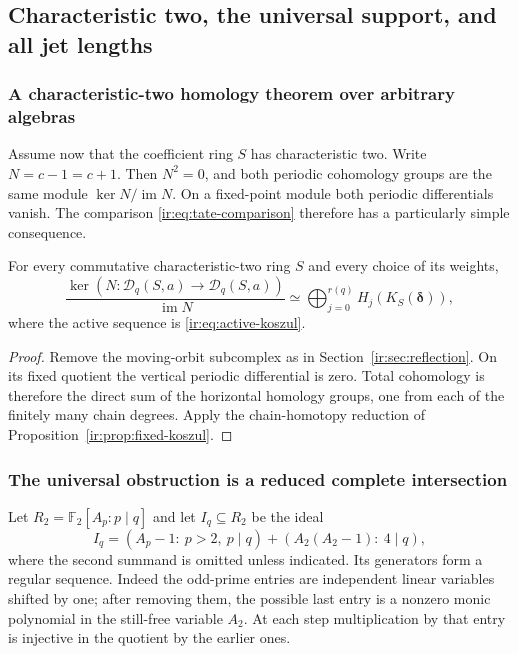 \subsection{Characteristic two, the universal support, and all jet lengths}
\label{ir:sec:modular}

\subsubsection{A characteristic-two homology theorem over arbitrary algebras}
Assume now that the coefficient ring $S$ has characteristic two.
Write $N=c-1=c+1$. Then $N^2=0$, and both periodic cohomology
groups are the same module $\ker N/\operatorname{im} N$. On a fixed-point module
both periodic differentials vanish. The comparison
\eqref{ir:eq:tate-comparison} therefore has a particularly simple
consequence.

\begin{theorem}
\label{ir:thm:char2-koszul}
For every commutative characteristic-two ring $S$ and every choice
of its weights,
\begin{equation}\label{ir:eq:char2-homology}
 \frac{\ker(N:\mathcal D_q(S,a)\to\mathcal D_q(S,a))}{\operatorname{im} N}
 \simeq\bigoplus_{j=0}^{r(q)}H_j(K_S(\boldsymbol\delta)),
\end{equation}
where the active sequence is \eqref{ir:eq:active-koszul}.
\end{theorem}
\begin{proof}
Remove the moving-orbit subcomplex as in
Section~\ref{ir:sec:reflection}. On its fixed quotient the vertical
periodic differential is zero. Total cohomology is therefore the
direct sum of the horizontal homology groups, one from each of the
finitely many chain degrees. Apply the chain-homotopy reduction of
Proposition~\ref{ir:prop:fixed-koszul}.
\end{proof}

\subsubsection{The universal obstruction is a reduced complete intersection}
Let $R_2=\mathbb F_2[A_p:p\mid q]$ and let $I_q\subseteq R_2$ be the ideal
\begin{equation}\label{ir:eq:universal-ideal}
 I_q=(A_p-1:\ p>2,\ p\mid q)
       +(A_2(A_2-1):\ 4\mid q),
\end{equation}
where the second summand is omitted unless indicated. Its generators
form a regular sequence. Indeed the odd-prime entries are independent
linear variables shifted by one; after removing them, the possible
last entry is a nonzero monic polynomial in the still-free variable
$A_2$. At each step multiplication by that entry is injective in the
quotient by the earlier ones.

